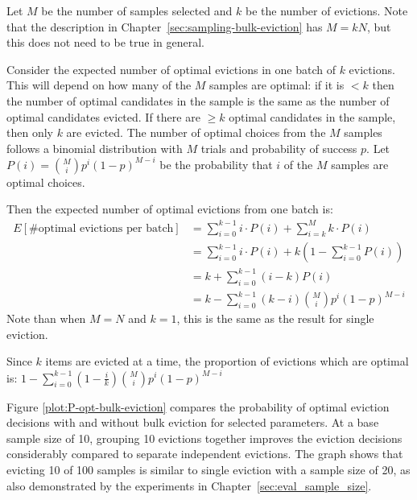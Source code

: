 Let $M$ be the number of samples selected and $k$ be the number of evictions. Note that the description in Chapter~\ref{sec:sampling-bulk-eviction} has $M=kN$, but this does not need to be true in general.

Consider the expected number of optimal evictions in one batch of $k$ evictions. This will depend on how many of the $M$ samples are optimal: if it is $<k$ then the number of optimal candidates in the sample is the same as the number of optimal candidates evicted. If there are $\ge k$ optimal candidates in the sample, then only $k$ are evicted. The number of optimal choices from the $M$ samples follows a binomial distribution with $M$ trials and probability of success $p$. Let $P(i) = {M \choose i} p^i (1-p)^{M-i}$ be the probability that $i$ of the $M$ samples are optimal choices.

Then the expected number of optimal evictions from one batch is:
\begin{align*}
    E[\text{\# optimal evictions per batch}] &= \sum_{i=0}^{k-1}{i\cdot P(i)} + \sum_{i=k}^{M}{k\cdot P(i)}\\ 
    &=  \sum_{i=0}^{k-1}{i\cdot P(i)} + k\left( 1-\sum_{i=0}^{k-1}{P(i)} \right)\\
    &= k + \sum_{i=0}^{k-1}(i-k)P(i)\\
    &= k - \sum_{i=0}^{k-1}{(k-i){M \choose i}p^i (1-p)^{M-i}}
\end{align*}
Note than when $M=N$ and $k=1$, this is the same as the result for single eviction.

Since $k$ items are evicted at a time, the proportion of evictions which are optimal is: $1 - \sum_{i=0}^{k-1}{\left(1 - \frac{i}{k}\right) {M \choose i} p^i (1-p)^{M-i}}$


Figure \ref{plot:P-opt-bulk-eviction} compares the probability of optimal eviction decisions with and without bulk eviction for selected parameters. At a base sample size of 10, grouping 10 evictions together improves the eviction decisions considerably compared to separate independent evictions. The graph shows that evicting 10 of 100 samples is similar to single eviction with a sample size of 20, as also demonstrated by the experiments in Chapter~\ref{sec:eval_sample_size}.




